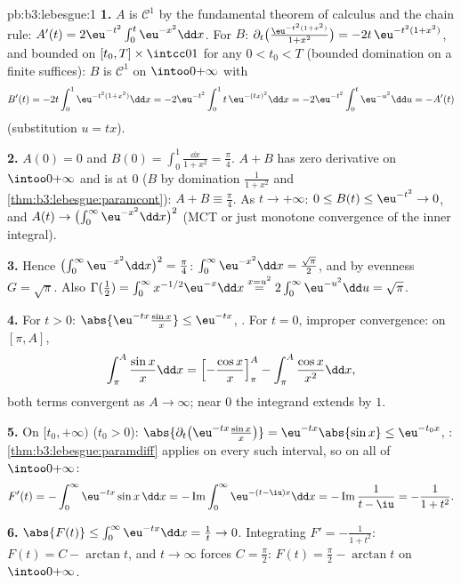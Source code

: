 \begin{solution}{pb:b3:lebesgue:1}
\textbf{1.} $A$ is $\mathcal C^1$ by the fundamental theorem
of calculus and the chain rule: $A'(t) =
2\eu^{-t^2}\int_0^t\eu^{-x^2}\dd x$. For $B$:
$\partial_t\bigl(\frac{\eu^{-t^2(1+x^2)}}{1+x^2}\bigr) =
-2t\,\eu^{-t^2(1+x^2)}$,  and bounded on $[t_0, T]
\times \intcc01$ for any $0 < t_0 < T$ (bounded domination on a
finite  suffices): $B$ is $\mathcal C^1$ on
$\intoo0{+\infty}$ with
\[
B'(t) = -2t\int_0^1 \eu^{-t^2(1+x^2)}\dd x
= -2\eu^{-t^2}\int_0^1 t\,\eu^{-(tx)^2}\dd x
= -2\eu^{-t^2}\int_0^t\eu^{-u^2}\dd u = -A'(t)
\]
(substitution $u = tx$).

\textbf{2.} $A(0) = 0$ and $B(0) = \int_0^1\frac{\dd x}{1+x^2}
= \frac\pi4$. $A + B$ has zero derivative on
$\intoo0{+\infty}$ and is  at $0$ ($B$ by
domination $\frac1{1+x^2}$ and
\cref{thm:b3:lebesgue:paramcont}): $A + B \equiv \frac\pi4$.
As $t\to+\infty$: $0 \leq B(t) \leq \eu^{-t^2} \to 0$, and
$A(t) \to \bigl(\int_0^\infty\eu^{-x^2}\dd x\bigr)^2$ (MCT or
just monotone convergence of the inner integral).

\textbf{3.} Hence $\bigl(\int_0^\infty\eu^{-x^2}\dd x\bigr)^2
= \frac\pi4$: $\int_0^\infty\eu^{-x^2}\dd x =
\frac{\sqrt\pi}2$, and by evenness $G = \sqrt\pi$. Also
$\Gamma(\frac12) = \int_0^\infty x^{-1/2}\eu^{-x}\dd x
\overset{x = u^2}{=} 2\int_0^\infty\eu^{-u^2}\dd u =
\sqrt\pi$.

\textbf{4.} For $t > 0$: $\abs{\eu^{-tx}\frac{\sin x}x} \leq
\eu^{-tx}$, . For $t = 0$, improper convergence: on
$[\pi, A]$,
\[
\int_\pi^A\frac{\sin x}x\dd x
= \Bigl[-\frac{\cos x}x\Bigr]_\pi^A -
\int_\pi^A\frac{\cos x}{x^2}\dd x,
\]
both terms convergent as $A \to \infty$; near $0$ the integrand
extends  by $1$.

\textbf{5.} On $[t_0, +\infty)$ ($t_0 > 0$):
$\abs{\partial_t\bigl(\eu^{-tx}\tfrac{\sin x}x\bigr)} =
\eu^{-tx}\abs{\sin x} \leq \eu^{-t_0x}$, :
\cref{thm:b3:lebesgue:paramdiff} applies on every such
interval, so on all of $\intoo0{+\infty}$:
\[
F'(t) = -\int_0^\infty\eu^{-tx}\sin x\,\dd x
= -\operatorname{Im}\int_0^\infty\eu^{-(t - \iu)x}\dd x
= -\operatorname{Im}\frac{1}{t - \iu} = -\frac{1}{1 + t^2}.
\]

\textbf{6.} $\abs{F(t)} \leq \int_0^\infty\eu^{-tx}\dd x =
\frac1t \to 0$. Integrating $F' = -\frac1{1+t^2}$: $F(t) = C -
\arctan t$, and $t \to \infty$ forces $C = \frac\pi2$: $F(t) =
\frac\pi2 - \arctan t$ on $\intoo0{+\infty}$.


\end{solution}
